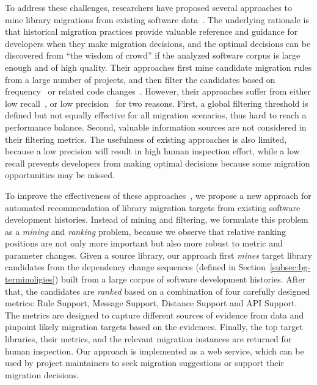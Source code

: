 \documentclass[conference, 10pt]{IEEEtran}
\begin{document}
To address these challenges, researchers have proposed
several approaches to mine library migrations from existing software data~\cite{2012WCRE-Teyton-Mining, 2014JournalOfSysAndSoft-Teyton-Study, 2019ICSME-Alrubaye-MigrationMiner}. The underlying rationale is that historical migration practices provide valuable reference and guidance for developers when they make migration decisions, and the optimal decisions can be discovered from ``the wisdom of crowd'' if the analyzed software corpus is large enough and of high quality.
Their approaches first mine candidate migration rules from a large number of projects, and then filter the candidates based on frequency~\cite{2012WCRE-Teyton-Mining} or related code changes~\cite{2019ICSME-Alrubaye-MigrationMiner}. However, their approaches suffer from either low recall~\cite{2012WCRE-Teyton-Mining, 2019ICSME-Alrubaye-MigrationMiner}, or low precision~\cite{2012WCRE-Teyton-Mining, 2014JournalOfSysAndSoft-Teyton-Study} for two reasons.
First, a global filtering threshold is defined but not equally effective for all migration scenarios, thus hard to reach a performance balance. 
Second, valuable information sources are not considered in their filtering metrics.
The usefulness of existing approaches is also limited, because a low precision will result in high human inspection effort, while a low recall prevents developers from making optimal decisions because some migration opportunities may be missed.

To improve the effectiveness of these approaches~\cite{2012WCRE-Teyton-Mining, 2014JournalOfSysAndSoft-Teyton-Study, 2019ICSME-Alrubaye-MigrationMiner}, we propose a new approach for automated recommendation of library migration targets from existing software development histories.
Instead of mining and filtering, we formulate this problem as a \textit{mining} and \textit{ranking} problem, because we observe that relative ranking positions are not only more important but also more robust to metric and parameter changes.
Given a source library, our approach first \textit{mines} target library candidates from the dependency change sequences (defined in Section~\ref{subsec:bg-terminoligies}) built from a large corpus of software development histories. 
After that, the candidates are \textit{ranked} based on a combination of four carefully designed metrics: Rule Support, Message Support, Distance Support and API Support.
The metrics are designed to capture different sources of evidence from data and pinpoint likely migration targets based on the evidences.
Finally, the top target libraries, their metrics, and the relevant migration instances are returned for human inspection.
Our approach is implemented as a web service, which can be used by project maintainers to seek migration suggestions or support their migration decisions. 
\end{document}
